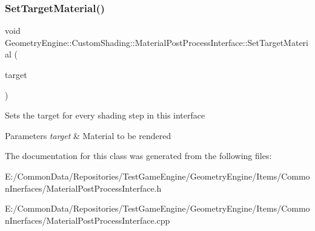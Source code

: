 \subsubsection{\texorpdfstring{SetTargetMaterial()}{SetTargetMaterial()}}
{\footnotesize\ttfamily void Geometry\+Engine\+::\+Custom\+Shading\+::\+Material\+Post\+Process\+Interface\+::\+Set\+Target\+Material (\begin{DoxyParamCaption}\item[{\mbox{\hyperlink{class_geometry_engine_1_1_geometry_material_1_1_material}{Geometry\+Material\+::\+Material}} $\ast$}]{target }\end{DoxyParamCaption})}

Sets the target for every shading step in this interface 
\begin{DoxyParams}{Parameters}
{\em target} & Material to be rendered \\
\hline
\end{DoxyParams}


The documentation for this class was generated from the following files\+:\begin{DoxyCompactItemize}
\item 
E\+:/\+Common\+Data/\+Repositories/\+Test\+Game\+Engine/\+Geometry\+Engine/\+Items/\+Common\+Inerfaces/Material\+Post\+Process\+Interface.\+h\item 
E\+:/\+Common\+Data/\+Repositories/\+Test\+Game\+Engine/\+Geometry\+Engine/\+Items/\+Common\+Inerfaces/Material\+Post\+Process\+Interface.\+cpp\end{DoxyCompactItemize}
